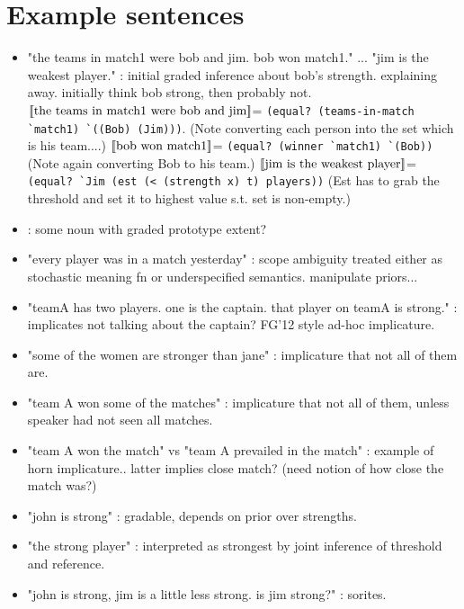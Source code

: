 \documentclass[pdfextras]{handbook}
\newcommand{\llbracket}{\ensuremath{\left [\!\left [}}%
\newcommand{\rrbracket}{\ensuremath{\right ]\!\right ]}}
\providecommand{\textsv}[1]{\ensuremath{\llbracket \text{#1} \rrbracket}}
\begin{document}
%
\pagebreak

\section{Example sentences}
\begin{itemize}
\item "the teams in match1 were bob and jim. bob won match1." ... "jim is the weakest player." : initial graded inference about bob's strength. explaining away. initially think bob strong, then probably not.
\subitem \textsv{the teams in match1 were bob and jim}= \lstinline{(equal? (teams-in-match `match1) `((Bob) (Jim)))}. (Note converting each person into the set which is his team....)
\subitem \textsv{bob won match1}= \lstinline{(equal? (winner `match1) `(Bob))} (Note again converting Bob to his team.)
\subitem \textsv{jim is the weakest player}= \lstinline{(equal? `Jim (est (< (strength x) t) players))}  (Est has to grab the threshold and set it to highest value s.t. set is non-empty.) 


\item : some noun with graded  prototype extent?
\item "every player was in a match yesterday" : scope ambiguity treated either as stochastic meaning fn or underspecified semantics. manipulate priors...
\item "teamA has two players. one is the captain. that player on teamA is strong." : implicates not talking about the captain?  FG'12 style ad-hoc implicature.
\item "some of the women are stronger than jane" : implicature that not all of them are.
\item "team A won some of the matches" : implicature that not all of them, unless speaker had not seen all matches.
\item "team A won the match" vs "team A prevailed in the match" : example of horn implicature.. latter implies close match? (need notion of how close the match was?)
\item "john is strong" : gradable, depends on prior over strengths.
\item "the strong player" : interpreted as strongest by joint inference of threshold and reference.
\item "john is strong, jim is a little less strong. is jim strong?" : sorites.
\end{itemize}
\end{document}
